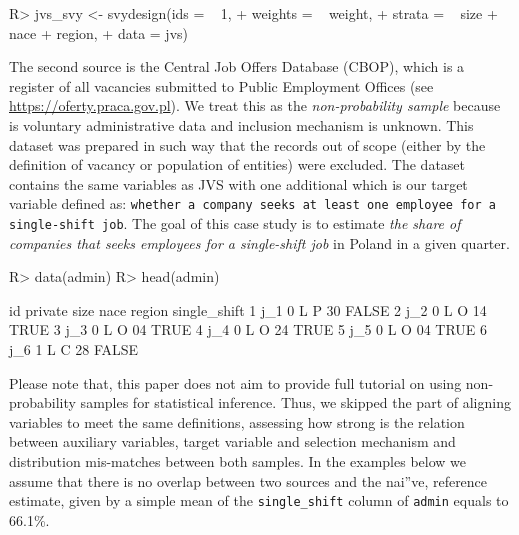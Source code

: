 \documentclass[
]{jss}
\begin{document}
\begin{CodeChunk}
\begin{CodeInput}
R> jvs_svy <- svydesign(ids = ~ 1, 
+                      weights = ~ weight,
+                      strata = ~ size + nace + region,
+                      data = jvs)
\end{CodeInput}
\end{CodeChunk}

The second source is the Central Job Offers Database (CBOP), which is a
register of all vacancies submitted to Public Employment Offices (see
\url{https://oferty.praca.gov.pl}). We treat this as the
\textit{non-probability sample} because is voluntary administrative data
and inclusion mechanism is unknown. This dataset was prepared in such
way that the records out of scope (either by the definition of vacancy
or population of entities) were excluded. The dataset contains the same
variables as JVS with one additional  which is our
target variable defined as:
\texttt{whether a company seeks at least one employee for a single-shift job}.
The goal of this case study is to estimate
\textit{the share of companies that seeks employees for a single-shift job}
in Poland in a given quarter.

\begin{CodeChunk}
\begin{CodeInput}
R> data(admin)
R> head(admin)
\end{CodeInput}
\begin{CodeOutput}
   id private size nace region single_shift
1 j_1       0    L    P     30        FALSE
2 j_2       0    L    O     14         TRUE
3 j_3       0    L    O     04         TRUE
4 j_4       0    L    O     24         TRUE
5 j_5       0    L    O     04         TRUE
6 j_6       1    L    C     28        FALSE
\end{CodeOutput}
\end{CodeChunk}

Please note that, this paper does not aim to provide full tutorial on
using non-probability samples for statistical inference. Thus, we
skipped the part of aligning variables to meet the same definitions,
assessing how strong is the relation between auxiliary variables, target
variable and selection mechanism and distribution mis-matches between
both samples. In the examples below we assume that there is no overlap
between two sources and the nai''ve, reference estimate, given by a
simple mean of the \texttt{single\_shift} column of \texttt{admin}
equals to 66.1\%.
\end{document}

